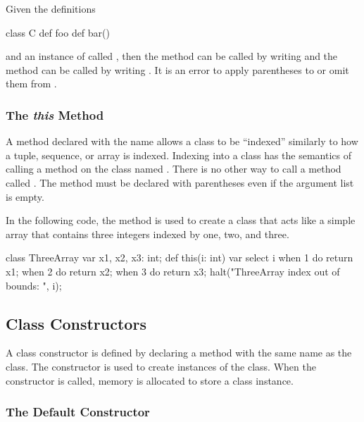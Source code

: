 \begin{example}
Given the definitions
\begin{chapel}
class C {
  def foo { }
  def bar() { }
}
\end{chapel}
and an instance of  called , then the
method  can be called by writing  and the
method  can be called by writing .  It is an
error to apply parentheses to  or omit them from .
\end{example}

\subsubsection{The {\em this} Method}
\label{The_em_this_Method}

A method declared with the name  allows a class to be
``indexed'' similarly to how a tuple, sequence, or array is indexed.
Indexing into a class has the semantics of calling a method on the
class named .  There is no other way to call a method
called .  The  method must be declared with
parentheses even if the argument list is empty.

\begin{example}
In the following code, the  method is used to create a
class that acts like a simple array that contains three integers
indexed by one, two, and three.
\begin{chapel}
class ThreeArray {
  var x1, x2, x3: int;
  def this(i: int) var {
    select i {
      when 1 do return x1;
      when 2 do return x2;
      when 3 do return x3;
    }
    halt("ThreeArray index out of bounds: ", i);
  }
}
\end{chapel}
\end{example}

\subsection{Class Constructors}
\label{Class_Constructors}

A class constructor is defined by declaring a method with the same
name as the class.  The constructor is used to create instances of the
class.  When the constructor is called, memory is allocated to store a
class instance.

\subsubsection{The Default Constructor}
\label{The_Default_Constructor}

